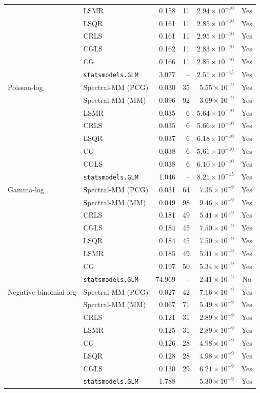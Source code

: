 \documentclass[10pt,a4paper]{article}
\begin{document}
\begin{longtable}{llrrrc}
 & LSMR & 0.158 & 11 & $2.94\times10^{-10}$ & Yes \\
 & LSQR & 0.161 & 11 & $2.85\times10^{-10}$ & Yes \\
 & CRLS & 0.161 & 11 & $2.95\times10^{-10}$ & Yes \\
 & CGLS & 0.162 & 11 & $2.83\times10^{-10}$ & Yes \\
 & CG & 0.166 & 11 & $2.85\times10^{-10}$ & Yes \\
 & \texttt{statsmodels.GLM} & 3.077 & -- & $2.51\times10^{-15}$ & Yes \\
\midrule
Poisson-log & Spectral-MM (PCG) & 0.030 & 35 & $5.55\times10^{-9}$ & Yes \\
 & Spectral-MM (MM) & 0.096 & 92 & $3.69\times10^{-9}$ & Yes \\
 & LSMR & 0.035 & 6 & $5.64\times10^{-10}$ & Yes \\
 & CRLS & 0.035 & 6 & $5.66\times10^{-10}$ & Yes \\
 & LSQR & 0.037 & 6 & $6.18\times10^{-10}$ & Yes \\
 & CG & 0.038 & 6 & $5.61\times10^{-10}$ & Yes \\
 & CGLS & 0.038 & 6 & $6.10\times10^{-10}$ & Yes \\
 & \texttt{statsmodels.GLM} & 1.046 & -- & $8.21\times10^{-15}$ & Yes \\
\midrule
Gamma-log & Spectral-MM (PCG) & 0.031 & 64 & $7.35\times10^{-9}$ & Yes \\
 & Spectral-MM (MM) & 0.049 & 98 & $9.46\times10^{-9}$ & Yes \\
 & CRLS & 0.181 & 49 & $5.41\times10^{-9}$ & Yes \\
 & CGLS & 0.184 & 45 & $7.50\times10^{-9}$ & Yes \\
 & LSQR & 0.184 & 45 & $7.50\times10^{-9}$ & Yes \\
 & LSMR & 0.185 & 49 & $5.41\times10^{-9}$ & Yes \\
 & CG & 0.197 & 50 & $5.34\times10^{-9}$ & Yes \\
 & \texttt{statsmodels.GLM} & 74.969 & -- & $2.41\times10^{-2}$ & No \\
\midrule
Negative-binomial-log & Spectral-MM (PCG) & 0.027 & 42 & $7.16\times10^{-9}$ & Yes \\
 & Spectral-MM (MM) & 0.067 & 71 & $5.49\times10^{-9}$ & Yes \\
 & CRLS & 0.121 & 31 & $2.89\times10^{-9}$ & Yes \\
 & LSMR & 0.125 & 31 & $2.89\times10^{-9}$ & Yes \\
 & CG & 0.126 & 28 & $4.98\times10^{-9}$ & Yes \\
 & LSQR & 0.128 & 28 & $4.98\times10^{-9}$ & Yes \\
 & CGLS & 0.130 & 29 & $6.21\times10^{-9}$ & Yes \\
 & \texttt{statsmodels.GLM} & 1.788 & -- & $5.30\times10^{-9}$ & Yes \\
\end{longtable}
\end{document}
